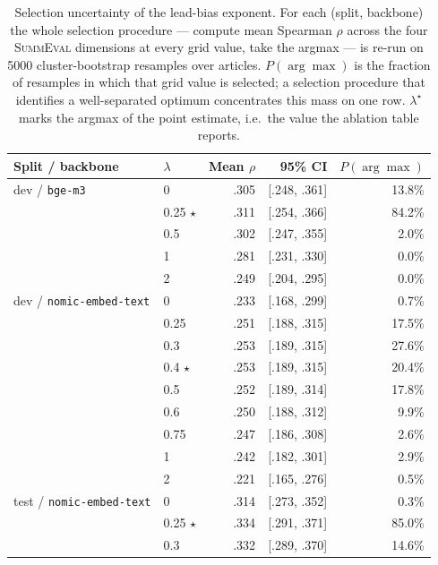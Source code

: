 \begin{table}[t]
\centering
\caption{Selection uncertainty of the lead-bias exponent. For each (split, backbone) the whole selection procedure --- compute mean Spearman $\rho$ across the four \textsc{SummEval} dimensions at every grid value, take the argmax --- is re-run on 5000 cluster-bootstrap resamples over articles. $P(\arg\max)$ is the fraction of resamples in which that grid value is selected; a selection procedure that identifies a well-separated optimum concentrates this mass on one row. $\lambda^{\star}$ marks the argmax of the point estimate, i.e.\ the value the ablation table reports.}
\label{tab:lambda_selection_ci}
\small
\linespread{1}\selectfont
\setlength{\tabcolsep}{4pt}
\begin{tabular}{@{}llrrr@{}}
\toprule
Split / backbone & $\lambda$ & Mean $\rho$ & 95\% CI & $P(\arg\max)$ \\
\midrule
dev / \texttt{bge-m3} & 0 & .305 & {\scriptsize [.248, .361]} & 13.8\% \\
 & 0.25 $\star$ & .311 & {\scriptsize [.254, .366]} & 84.2\% \\
 & 0.5 & .302 & {\scriptsize [.247, .355]} & 2.0\% \\
 & 1 & .281 & {\scriptsize [.231, .330]} & 0.0\% \\
 & 2 & .249 & {\scriptsize [.204, .295]} & 0.0\% \\
\addlinespace[3pt]
dev / \texttt{nomic-embed-text} & 0 & .233 & {\scriptsize [.168, .299]} & 0.7\% \\
 & 0.25 & .251 & {\scriptsize [.188, .315]} & 17.5\% \\
 & 0.3 & .253 & {\scriptsize [.189, .315]} & 27.6\% \\
 & 0.4 $\star$ & .253 & {\scriptsize [.189, .315]} & 20.4\% \\
 & 0.5 & .252 & {\scriptsize [.189, .314]} & 17.8\% \\
 & 0.6 & .250 & {\scriptsize [.188, .312]} & 9.9\% \\
 & 0.75 & .247 & {\scriptsize [.186, .308]} & 2.6\% \\
 & 1 & .242 & {\scriptsize [.182, .301]} & 2.9\% \\
 & 2 & .221 & {\scriptsize [.165, .276]} & 0.5\% \\
\addlinespace[3pt]
test / \texttt{nomic-embed-text} & 0 & .314 & {\scriptsize [.273, .352]} & 0.3\% \\
 & 0.25 $\star$ & .334 & {\scriptsize [.291, .371]} & 85.0\% \\
 & 0.3 & .332 & {\scriptsize [.289, .370]} & 14.6\% \\

\end{tabular}
\end{table}
